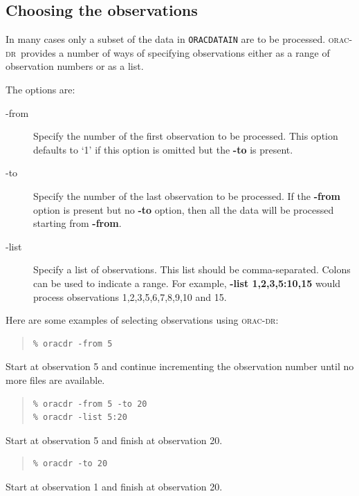 \documentclass[twoside,11pt]{article}
\newcommand{\xref}[3]{#1}
\newcommand{\xlabel}[1]{}
\renewcommand{\_}{\texttt{\symbol{95}}}
\newcommand{\oracdr}{\xref{\textsc{orac-dr}}{sun230}{}}
\newenvironment{myquote}{\begin{quote}\begin{small}}{\end{small}\end{quote}}
\begin{document}
\subsection{Choosing the observations\xlabel{choosing_the_observations}}

In many cases only a subset of the data in \texttt{ORAC\_DATA\_IN} are to be
processed. \oracdr\ provides a number of ways of specifying observations
either as a range of observation numbers or as a list.

The options are:

\begin{description}
\item[-from] \mbox{}

Specify the number of the first observation to be processed. 
This option defaults to `1' if this option is omitted but the \textbf{-to} is
present.

\item[-to] \mbox{}

Specify the number of the last observation to be processed. If
the \textbf{-from} option is present but no \textbf{-to} option, then
all the data will be processed starting from \textbf{-from}.

\item[-list] \mbox{}

Specify a list of observations. This list should be comma-separated. Colons
can be used to indicate a range. For example, \textbf{-list 1,2,3,5:10,15}
would process observations 1,2,3,5,6,7,8,9,10 and 15.

\end{description}

Here are some examples of selecting observations using \oracdr:

\begin{myquote}
\begin{verbatim}
% oracdr -from 5
\end{verbatim}
\end{myquote}
Start at observation 5 and continue incrementing the observation number
until no more files are available.
\begin{myquote}
\begin{verbatim}
% oracdr -from 5 -to 20
% oracdr -list 5:20
\end{verbatim}
\end{myquote}
Start at observation 5 and finish at observation 20.

\begin{myquote}
\begin{verbatim}
% oracdr -to 20
\end{verbatim}
\end{myquote}
Start at observation 1 and finish at observation 20.
\end{document}
